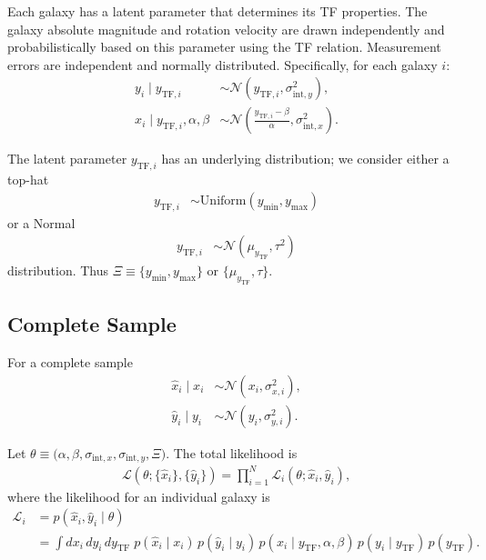 Each galaxy has a latent parameter that determines its TF properties. The galaxy absolute magnitude and
rotation velocity are drawn independently and probabilistically based on this parameter using the TF relation.
Measurement errors are independent and normally distributed. Specifically, for each galaxy $i$:
\begin{align}
y_i \mid y_{\text{TF},i} &\sim \mathcal N(y_{\text{TF},i},\sigma^2_{\text{int},y}),\\
x_i \mid y_{\text{TF},i}, \alpha, \beta &\sim \mathcal N\!\left(\frac{y_{\text{TF},i}-\beta}{\alpha},\sigma^2_{\text{int},x}\right).
\end{align}

The latent parameter $y_{\text{TF},i}$ has an underlying distribution; we consider either a top-hat
\begin{align}
y_{\text{TF},i} & \sim \text{Uniform}(y_{\min}, y_{\max})
\end{align}
or a Normal
\begin{align}
y_{\text{TF},i} & \sim \mathcal N (\mu_{y_\mathrm{TF}}, \tau^2)
\end{align}
distribution. Thus $\Xi \equiv \{y_{\min}, y_{\max}\}$ or $\{\mu_{y_\mathrm{TF}}, \tau\}$.

\subsection{Complete Sample}
For a complete sample
\begin{align}
\hat x_i \mid x_i &\sim \mathcal N(x_i,\sigma^2_{x,i}),\\
\hat y_i \mid y_i &\sim \mathcal N(y_i,\sigma^2_{y,i}).
\end{align}

Let $\theta \equiv \bigl(\alpha,\beta,\sigma_{\text{int},x},\sigma_{\text{int},y}, \Xi \bigr)$.
The total likelihood is
\begin{align}
\mathcal L(\theta;\{\hat x_i\},\{\hat y_i\})
= \prod_{i=1}^{N} \mathcal L_i(\theta;\hat x_i,\hat y_i),
\end{align}
where the likelihood for an individual galaxy is
\begin{align}
\mathcal L_i
&= p(\hat x_i,\hat y_i \mid \theta) \label{eqn:likelihood}\\
&= \int dx_i\,dy_i\,dy_{\text{TF}}\;
p(\hat x_i\mid x_i)\,p(\hat y_i\mid y_i)\,
p(x_i\mid y_{\text{TF}},\alpha,\beta)\,p(y_i\mid y_{\text{TF}})\,p(y_{\text{TF}}).
\end{align}

